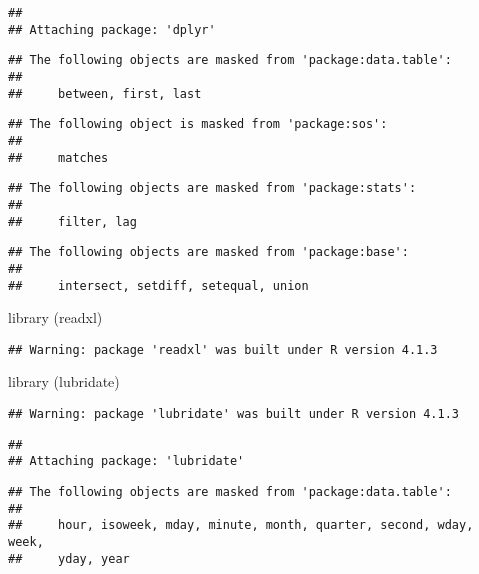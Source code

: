 \documentclass[
]{article}
\newenvironment{Shaded}{\begin{snugshade}}{\end{snugshade}}
\newcommand{\FunctionTok}[1]{\textcolor[rgb]{0.00,0.00,0.00}{#1}}
\newcommand{\NormalTok}[1]{#1}
\begin{document}
\begin{verbatim}
## 
## Attaching package: 'dplyr'
\end{verbatim}

\begin{verbatim}
## The following objects are masked from 'package:data.table':
## 
##     between, first, last
\end{verbatim}

\begin{verbatim}
## The following object is masked from 'package:sos':
## 
##     matches
\end{verbatim}

\begin{verbatim}
## The following objects are masked from 'package:stats':
## 
##     filter, lag
\end{verbatim}

\begin{verbatim}
## The following objects are masked from 'package:base':
## 
##     intersect, setdiff, setequal, union
\end{verbatim}

\begin{Shaded}
\begin{Highlighting}[]
\FunctionTok{library}\NormalTok{ (readxl)}
\end{Highlighting}
\end{Shaded}

\begin{verbatim}
## Warning: package 'readxl' was built under R version 4.1.3
\end{verbatim}

\begin{Shaded}
\begin{Highlighting}[]
\FunctionTok{library}\NormalTok{ (lubridate)}
\end{Highlighting}
\end{Shaded}

\begin{verbatim}
## Warning: package 'lubridate' was built under R version 4.1.3
\end{verbatim}

\begin{verbatim}
## 
## Attaching package: 'lubridate'
\end{verbatim}

\begin{verbatim}
## The following objects are masked from 'package:data.table':
## 
##     hour, isoweek, mday, minute, month, quarter, second, wday, week,
##     yday, year
\end{verbatim}
\end{document}
